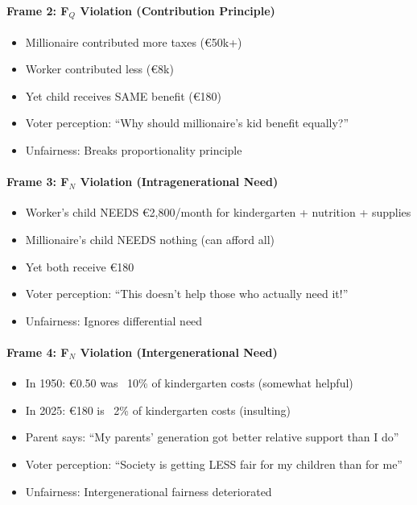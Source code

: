 \paragraph{Frame 2: F$_Q$ Violation (Contribution Principle)}
\begin{itemize}[nosep]
\item Millionaire contributed more taxes (€50k+)
\item Worker contributed less (€8k)
\item Yet child receives SAME benefit (€180)
\item Voter perception: ``Why should millionaire's kid benefit equally?''
\item Unfairness: Breaks proportionality principle
\end{itemize}

\paragraph{Frame 3: F$_N$ Violation (Intragenerational Need)}
\begin{itemize}[nosep]
\item Worker's child NEEDS €2,800/month for kindergarten + nutrition + supplies
\item Millionaire's child NEEDS nothing (can afford all)
\item Yet both receive €180
\item Voter perception: ``This doesn't help those who actually need it!''
\item Unfairness: Ignores differential need
\end{itemize}

\paragraph{Frame 4: F$_N$ Violation (Intergenerational Need)}
\begin{itemize}[nosep]
\item In 1950: €0.50 was ~10\% of kindergarten costs (somewhat helpful)
\item In 2025: €180 is ~2\% of kindergarten costs (insulting)
\item Parent says: ``My parents' generation got better relative support than I do''
\item Voter perception: ``Society is getting LESS fair for my children than for me''
\item Unfairness: Intergenerational fairness deteriorated
\end{itemize}


